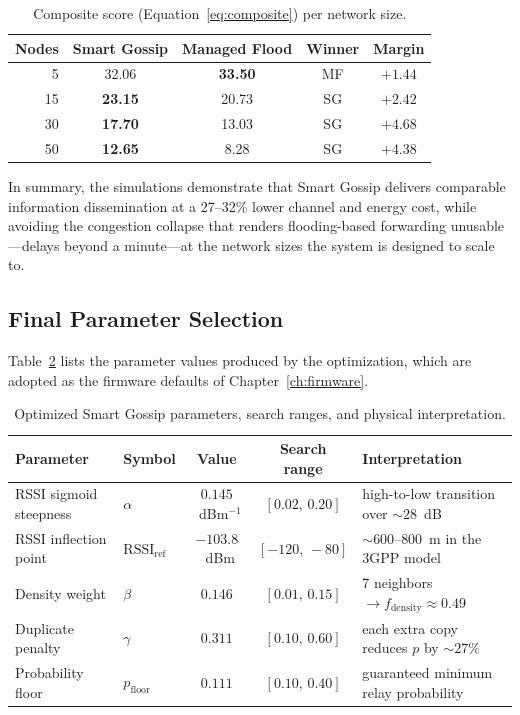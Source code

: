 \documentclass[english,bachelor]{tfgitic}[2026/01/22]
\begin{document}
\begin{table}[htbp]
    \centering
    \caption{Composite score (Equation~\eqref{eq:composite}) per network size.}
    \label{tab:res_score}
    \begin{tabular}{rcccc}
        \toprule
        Nodes & Smart Gossip & Managed Flood & Winner & Margin \\
        \midrule
        5  & 32.06 & \textbf{33.50} & MF & $+1.44$ \\
        15 & \textbf{23.15} & 20.73 & SG & $+2.42$ \\
        30 & \textbf{17.70} & 13.03 & SG & $+4.68$ \\
        50 & \textbf{12.65} & 8.28  & SG & $+4.38$ \\
        \bottomrule
    \end{tabular}
\end{table}
 
In summary, the simulations demonstrate that Smart Gossip delivers comparable information dissemination at a 27--32\% lower channel and energy cost, while avoiding the congestion collapse that renders flooding-based forwarding unusable---delays beyond a minute---at the network sizes the system is designed to scale to.
 
\subsection{Final Parameter Selection}
\label{sec:sim_final_params}

Table~\ref{tab:sg_params} lists the parameter values produced by the optimization, which are adopted as the firmware defaults of Chapter~\ref{ch:firmware}.
 
\begin{table}[htbp]
    \centering
    \caption{Optimized Smart Gossip parameters, search ranges, and physical interpretation.}
    \label{tab:sg_params}
    \begin{tabular}{llccl}
        \toprule
        Parameter & Symbol & Value & Search range & Interpretation \\
        \midrule
        RSSI sigmoid steepness & $\alpha$ & $0.145$~dBm$^{-1}$ & $[0.02,\,0.20]$ & high-to-low transition over ${\sim}28$~dB \\
        RSSI inflection point  & $\mathrm{RSSI}_{\text{ref}}$ & $-103.8$~dBm & $[-120,\,-80]$ & ${\sim}600$--$800$~m in the 3GPP model \\
        Density weight         & $\beta$ & $0.146$ & $[0.01,\,0.15]$ & 7 neighbors $\rightarrow f_{\text{density}} \approx 0.49$ \\
        Duplicate penalty      & $\gamma$ & $0.311$ & $[0.10,\,0.60]$ & each extra copy reduces $p$ by ${\sim}27\%$ \\
        Probability floor      & $p_{\text{floor}}$ & $0.111$ & $[0.10,\,0.40]$ & guaranteed minimum relay probability \\
        \bottomrule
    \end{tabular}
\end{table}
 
\end{document}
